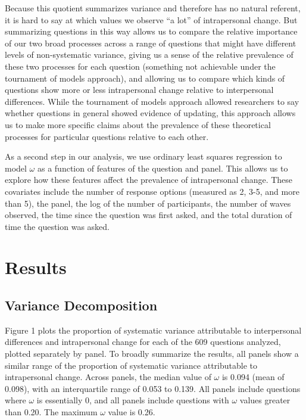 \documentclass[
  12pt,
]{article}
\begin{document}
Because this quotient summarizes variance and therefore has no natural
referent, it is hard to say at which values we observe ``a lot'' of
intrapersonal change. But summarizing questions in this way allows us to
compare the relative importance of our two broad processes across a
range of questions that might have different levels of non-systematic
variance, giving us a sense of the relative prevalence of these two
processes for each question (something not achievable under the
tournament of models approach), and allowing us to compare which kinds
of questions show more or less intrapersonal change relative to
interpersonal differences. While the tournament of models approach
allowed researchers to say whether questions in general showed evidence
of updating, this approach allows us to make more specific claims about
the prevalence of these theoretical processes for particular questions
relative to each other.

As a second step in our analysis, we use ordinary least squares
regression to model \(\omega\) as a function of features of the question
and panel. This allows us to explore how these features affect the
prevalence of intrapersonal change. These covariates include the number
of response options (measured as 2, 3-5, and more than 5), the panel,
the log of the number of participants, the number of waves observed, the
time since the question was first asked, and the total duration of time
the question was asked.

\hypertarget{results}{%
\section{Results}\label{results}}

\hypertarget{variance-decomposition}{%
\subsection{Variance Decomposition}\label{variance-decomposition}}

Figure 1 plots the proportion of systematic variance attributable to
interpersonal differences and intrapersonal change for each of the 609
questions analyzed, plotted separately by panel. To broadly summarize
the results, all panels show a similar range of the proportion of
systematic variance attributable to intrapersonal change. Across panels,
the median value of \(\omega\) is 0.094 (mean of 0.098), with an
interquartile range of 0.053 to 0.139. All panels include questions
where \(\omega\) is essentially 0, and all panels include questions with
\(\omega\) values greater than 0.20. The maximum \(\omega\) value is
0.26.
\end{document}
